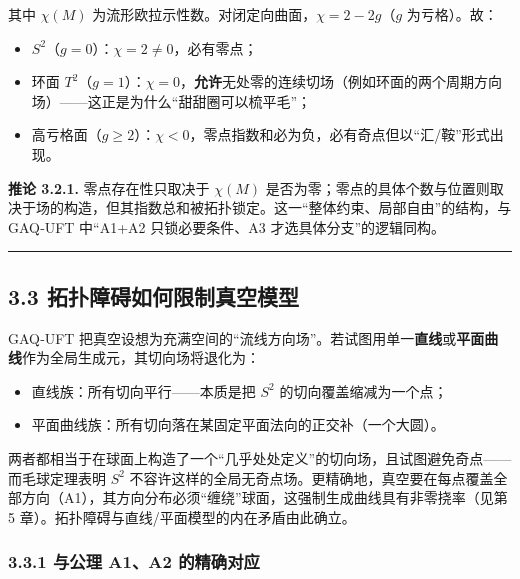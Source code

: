其中 \(\chi(M)\) 为流形欧拉示性数。对闭定向曲面，\(\chi=2-2g\)（\(g\)
为亏格）。故：

\begin{itemize}
\tightlist
\item
  \(S^2\)（\(g=0\)）：\(\chi=2\neq0\)，必有零点；
\item
  环面
  \(T^2\)（\(g=1\)）：\(\chi=0\)，\textbf{允许}无处零的连续切场（例如环面的两个周期方向场）------这正是为什么``甜甜圈可以梳平毛''；
\item
  高亏格面（\(g\ge2\)）：\(\chi<0\)，零点指数和必为负，必有奇点但以``汇/鞍''形式出现。
\end{itemize}

\textbf{推论 3.2.1.} 零点存在性只取决于 \(\chi(M)\)
是否为零；零点的具体个数与位置则取决于场的构造，但其指数总和被拓扑锁定。这一``整体约束、局部自由''的结构，与
GAQ‑UFT 中``A1+A2 只锁必要条件、A3 才选具体分支''的逻辑同构。

\begin{center}\rule{0.5\linewidth}{0.5pt}\end{center}

\subsection{3.3
拓扑障碍如何限制真空模型}\label{ux62d3ux6251ux969cux788dux5982ux4f55ux9650ux5236ux771fux7a7aux6a21ux578b}

GAQ‑UFT
把真空设想为充满空间的``流线方向场''。若试图用单一\textbf{直线}或\textbf{平面曲线}作为全局生成元，其切向场将退化为：

\begin{itemize}
\tightlist
\item
  直线族：所有切向平行------本质是把 \(S^2\) 的切向覆盖缩减为一个点；
\item
  平面曲线族：所有切向落在某固定平面法向的正交补（一个大圆）。
\end{itemize}

两者都相当于在球面上构造了一个``几乎处处定义''的切向场，且试图避免奇点------而毛球定理表明
\(S^2\)
不容许这样的全局无奇点场。更精确地，真空要在每点覆盖全部方向（A1），其方向分布必须``缠绕''球面，这强制生成曲线具有非零挠率（见第
5 章）。拓扑障碍与直线/平面模型的内在矛盾由此确立。

\subsubsection{3.3.1 与公理 A1、A2
的精确对应}\label{ux4e0eux516cux7406-a1a2-ux7684ux7cbeux786eux5bf9ux5e94}

